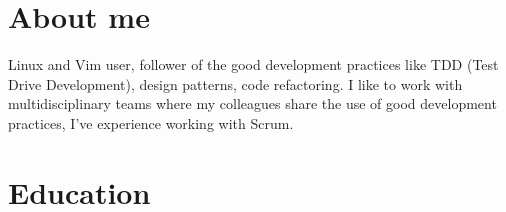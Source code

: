 \documentclass[10pt,a4paper,sans,colorlinks]{moderncv} %
\begin{document}







\newpage


\makecvtitle %

\section{About me}
  Linux and Vim user, follower of the good development practices like TDD (Test Drive Development), design patterns, code refactoring.
  I like to work with multidisciplinary teams where my colleagues share the use of good development practices, I've experience working with Scrum.

\section{Education}

\end{document}
